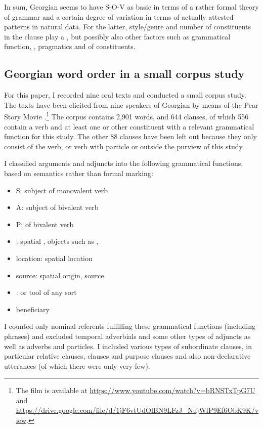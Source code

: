 \documentclass[output=paper,colorlinks,citecolor=brown,draftmode]{langscibook}
\begin{document}
In sum, Georgian seems to have S-O-V as basic  in terms of a rather formal theory of grammar and a certain degree of variation in terms of actually attested patterns in natural data. For the latter, style/genre and number of constituents in the clause play a , but possibly also other factors such as grammatical function, , pragmatics and  of constituents. 

\subsection{Georgian word order in a small corpus study}\label{EC:ss:2.3}

For this paper, I recorded nine oral texts and conducted a small corpus study. The texts have been elicited from nine speakers of Georgian by means of the Pear Story Movie \citep{chafe_pear_1980}.\footnote{The film is available at \url{https://www.youtube.com/watch?v=bRNSTxTpG7U} and \url{https://drive.google.com/file/d/1jF6vtUdOlBN9LFzJ_NujWfP9Ef6ObK9K/view}.} The corpus contains 2,901 words, and 644 clauses, of which 556 contain a verb and at least one  or other constituent with a relevant grammatical function for this study. The other 88 clauses have been left out because they only consist of the verb, or verb with particle or  outside the purview of this study. 

I classified arguments and adjuncts into the following grammatical functions, based on semantics rather than formal marking:

\begin{itemize}
\item S: subject of monovalent verb
\item A: subject of bivalent verb
\item P:  of bivalent verb
\item {}: spatial , objects such as , 
\item location: spatial location
\item source: spatial origin, source
\item {}:  or tool of any sort
\item beneficiary
\end{itemize}

I counted only nominal referents fulfilling these grammatical functions (including  phrases) and excluded temporal adverbials and some other types of adjuncts as well as adverbs and particles. I included various types of subordinate clauses, in particular relative clauses,  clauses and purpose clauses and also non-declarative utterances (of which there were only very few).
\end{document}
